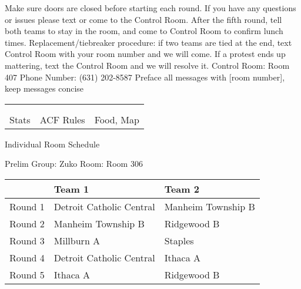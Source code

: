 \documentclass{article}%
\begin{document}
\newline%
Make sure doors are closed before starting each round. If you have any questions or issues please text or come to the Control Room.\newline%
\newline%
After the fifth round, tell both teams to stay in the room, and come to Control Room to confirm lunch times.\newline%
\newline%
Replacement/tiebreaker procedure: if two teams are tied at the end, text Control Room with your room number and we will come. If a protest ends up mattering, text the Control Room and we will resolve it.\newline%
\newline%
Control Room: Room 407\newline%
Phone Number: (631) 202{-}8587\newline%
Preface all messages with {[}room number{]}, keep messages concise%
\vspace*{30pt}%
\newline%
%
\begin{tabularx}{\textwidth}{YYY}%
  &  &  \\%
\\%
Stats&ACF Rules&Food, Map\\%
\end{tabularx}%
\newpage%
\begin{center}%
\begin{Huge}%
Individual Room Schedule%
\end{Huge}%
\vspace*{16pt}%
\linebreak%
\begin{Large}%
Prelim Group: Zuko \hfill Room: Room 306%
\end{Large}%
\end{center}%
%
\begin{tabularx}{\textwidth}{|c|Y|Y|}%
\hline%
&Team 1&Team 2\\%
\hline%
Round 1&Detroit Catholic Central&Manheim Township B\\%
Round 2&Manheim Township B&Ridgewood B\\%
Round 3&Millburn A&Staples\\%
Round 4&Detroit Catholic Central&Ithaca A\\%
Round 5&Ithaca A&Ridgewood B\\%
\hline%
\end{tabularx}%
\end{document}
